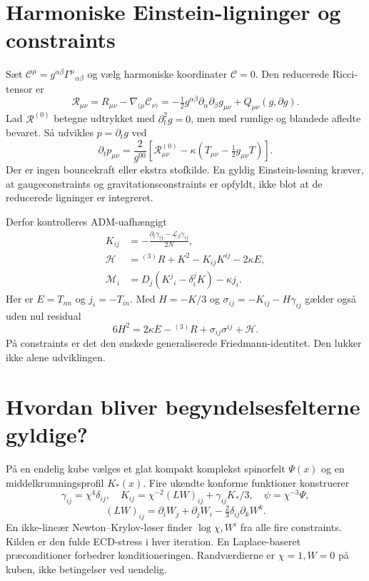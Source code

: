 \documentclass[11pt,a4paper]{article}
\begin{document}
\section{Harmoniske Einstein-ligninger og constraints}
Sæt $\mathcal C^\mu=g^{\alpha\beta}\Gamma^\mu{}_{\alpha\beta}$ og vælg harmoniske koordinater $\mathcal C=0$. Den reducerede Ricci-tensor er
\[
 \mathcal R_{\mu\nu}=R_{\mu\nu}-\nabla_{(\mu}\mathcal C_{\nu)}
 =-\tfrac12g^{\alpha\beta}\partial_\alpha\partial_\beta g_{\mu\nu}+Q_{\mu\nu}(g,\partial g).
\]
Lad $\mathcal R^{(0)}$ betegne udtrykket med $\partial_t^2g=0$, men med rumlige og blandede afledte bevaret. Så udvikles $p=\partial_tg$ ved
\[
 \partial_t p_{\mu\nu}=\frac2{g^{00}}\left[\mathcal R^{(0)}_{\mu\nu}
 -\kappa(T_{\mu\nu}-\tfrac12g_{\mu\nu}T)\right].
\]
Der er ingen bouncekraft eller ekstra stofkilde. En gyldig Einstein-løsning kræver, at gaugeconstraints og gravitationsconstraints er opfyldt, ikke blot at de reducerede ligninger er integreret.

Derfor kontrolleres ADM-uafhængigt
\begin{align*}
 K_{ij}&=-\frac{\partial_t\gamma_{ij}-\mathcal L_\beta\gamma_{ij}}{2N},\\
 \mathcal H&={}^{(3)}R+K^2-K_{ij}K^{ij}-2\kappa E,\\
 \mathcal M_i&=D_j(K^j{}_i-\delta^j_iK)-\kappa j_i.
\end{align*}
Her er $E=T_{nn}$ og $j_i=-T_{in}$. Med $H=-K/3$ og $\sigma_{ij}=-K_{ij}-H\gamma_{ij}$ gælder også uden nul residual
\[
 6H^2=2\kappa E-{}^{(3)}R+\sigma_{ij}\sigma^{ij}+\mathcal H.
\]
På constraints er det den ønskede generaliserede Friedmann-identitet. Den lukker ikke alene udviklingen.

\section{Hvordan bliver begyndelsesfelterne gyldige?}
På en endelig kube vælges et glat kompakt komplekst spinorfelt $\Psi(x)$ og en middelkrumningsprofil $K_*(x)$. Fire ukendte konforme funktioner konstruerer
\[
 \gamma_{ij}=\chi^4\delta_{ij},\quad
 K_{ij}=\chi^{-2}(LW)_{ij}+\gamma_{ij}K_*/3,\quad
 \psi=\chi^{-3}\Psi,
\]
\[
 (LW)_{ij}=\partial_iW_j+\partial_jW_i-\tfrac23\delta_{ij}\partial_kW^k.
\]
En ikke-lineær Newton--Krylov-løser finder $\log\chi,W^i$ fra alle fire constraints. Kilden er den fulde ECD-stress i hver iteration. En Laplace-baseret præconditioner forbedrer konditioneringen. Randværdierne er $\chi=1,W=0$ på kuben, ikke betingelser ved uendelig.
\end{document}
